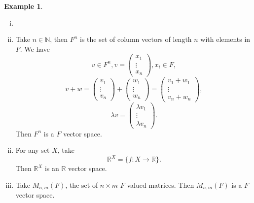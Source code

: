 \documentclass[12pt]{article}
\theoremstyle{definition}
\newtheorem{example}{Example}[section]
\theoremstyle{remark}
\begin{document}
\begin{adjustbox}{minipage = \columnwidth - 25.5pt, margin=1em, frame=1pt, margin=0em}
\begin{example}
	\begin{enumerate}[(i)]
		\item[]
		\item Take $n \in \mathbb{N}$, then $F^{n}$ is the set of column vectors of length $n$ with elements in $F$. We have
			\[
			v \in F^{n}, v =
			\begin{pmatrix}
				x_1 \\
				\vdots \\
				x_n
			\end{pmatrix}
			, x_i \in F
			,\]
			\[
			v + w =
			\begin{pmatrix}
				v_1 \\
				\vdots \\
				v_n
			\end{pmatrix}
			+
			\begin{pmatrix}
				w_1 \\
				\vdots \\
				w_n
			\end{pmatrix}
			=
			\begin{pmatrix}
				v_1 + w_1 \\
				\vdots \\
				v_n + w_n
			\end{pmatrix}
			,\]
			\[
			\lambda v =
			\begin{pmatrix}
				\lambda v_1 \\
				\vdots \\
				\lambda v_n
			\end{pmatrix}
			.\]
			Then $F^{n}$ is a $F$ vector space.
	\end{enumerate}
	
\end{example}

\end{adjustbox}

\begin{adjustbox}{minipage = \columnwidth - 25.5pt, margin=1em, frame=1pt, margin=0em}
	\begin{enumerate}[(i)]
		\setcounter{enumi}{1}
		\item For any set $X$, take
			\[
				\mathbb{R}^{X} = \{f : X \to \mathbb{R}\}
			.\]
			Then $\mathbb{R}^{X}$ is an $\mathbb{R}$ vector space.
		\item Take $M_{n, m}(F)$, the set of $n \times m$ $F$ valued matrices. Then $M_{n, m}(F)$ is a $F$ vector space.
\end{enumerate}

\end{adjustbox}
\end{document}
